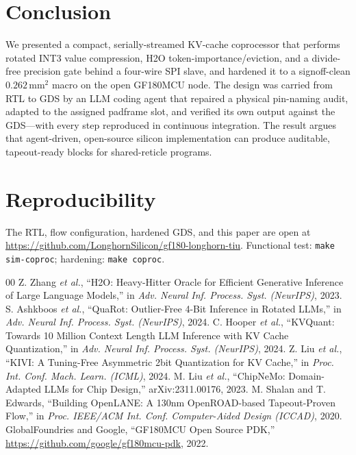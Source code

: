 \documentclass[conference]{IEEEtran}
\begin{document}
\section{Conclusion}
We presented a compact, serially-streamed KV-cache coprocessor that performs
rotated INT3 value compression, H2O token-importance/eviction, and a divide-free
precision gate behind a four-wire SPI slave, and hardened it to a signoff-clean
$0.262\,\text{mm}^2$ macro on the open GF180MCU node. The design was carried from
RTL to GDS by an LLM coding agent that repaired a physical pin-naming audit,
adapted to the assigned padframe slot, and verified its own output against the
GDS---with every step reproduced in continuous integration. The result argues
that agent-driven, open-source silicon implementation can produce auditable,
tapeout-ready blocks for shared-reticle programs.

\section*{Reproducibility}
The RTL, flow configuration, hardened GDS, and this paper are open at
\url{https://github.com/LonghornSilicon/gf180-longhorn-tiu}. Functional test:
\texttt{make sim-coproc}; hardening: \texttt{make coproc}.

\begin{thebibliography}{00}
 Z. Zhang \textit{et al.}, ``H2O: Heavy-Hitter Oracle for Efficient
Generative Inference of Large Language Models,'' in \textit{Adv. Neural Inf.
Process. Syst. (NeurIPS)}, 2023.
 S. Ashkboos \textit{et al.}, ``QuaRot: Outlier-Free 4-Bit
Inference in Rotated LLMs,'' in \textit{Adv. Neural Inf. Process. Syst.
(NeurIPS)}, 2024.
 C. Hooper \textit{et al.}, ``KVQuant: Towards 10 Million
Context Length LLM Inference with KV Cache Quantization,'' in \textit{Adv. Neural
Inf. Process. Syst. (NeurIPS)}, 2024.
 Z. Liu \textit{et al.}, ``KIVI: A Tuning-Free Asymmetric 2bit
Quantization for KV Cache,'' in \textit{Proc. Int. Conf. Mach. Learn. (ICML)},
2024.
 M. Liu \textit{et al.}, ``ChipNeMo: Domain-Adapted LLMs for
Chip Design,'' arXiv:2311.00176, 2023.
 M. Shalan and T. Edwards, ``Building OpenLANE: A 130nm
OpenROAD-based Tapeout-Proven Flow,'' in \textit{Proc. IEEE/ACM Int. Conf.
Computer-Aided Design (ICCAD)}, 2020.
 GlobalFoundries and Google, ``GF180MCU Open Source PDK,''
\url{https://github.com/google/gf180mcu-pdk}, 2022.
\end{thebibliography}
\end{document}
